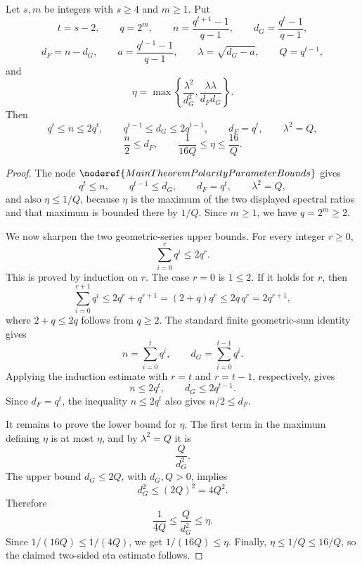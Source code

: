 \begin{helper}
Let \(s,m\) be integers with \(s\ge4\) and \(m\ge1\).  Put
\[
  t=s-2,\qquad q=2^m,\qquad
  n=\frac{q^{t+1}-1}{q-1},\qquad
  d_G=\frac{q^t-1}{q-1},
\]
\[
  d_F=n-d_G,\qquad
  a=\frac{q^{t-1}-1}{q-1},\qquad
  \lambda=\sqrt{d_G-a},\qquad Q=q^{t-1},
\]
and
\[
  \eta=\max\left\{\frac{\lambda^2}{d_G^2},
    \frac{\lambda\lambda}{d_Fd_G}\right\}.
\]
Then
\[
  q^t\le n\le2q^t,\qquad
  q^{t-1}\le d_G\le2q^{t-1},\qquad
  d_F=q^t,\qquad \lambda^2=Q,
\]
\[
  \frac n2\le d_F,\qquad
  \frac{1}{16Q}\le\eta\le\frac{16}{Q}.
\]
\end{helper}
\begin{proof}
The node \(\noderef{MainTheoremPolarityParameterBounds}\) gives
\[
  q^t\le n,\qquad q^{t-1}\le d_G,\qquad d_F=q^t,\qquad
  \lambda^2=Q,
\]
and also \(\eta\le 1/Q\), because \(\eta\) is the maximum of the two displayed
spectral ratios and that maximum is bounded there by \(1/Q\).  Since \(m\ge1\),
we have \(q=2^m\ge2\).

We now sharpen the two geometric-series upper bounds.  For every integer
\(r\ge0\),
\[
  \sum_{i=0}^r q^i\le 2q^r.
\]
This is proved by induction on \(r\).  The case \(r=0\) is \(1\le2\).  If it
holds for \(r\), then
\[
  \sum_{i=0}^{r+1}q^i
    \le 2q^r+q^{r+1}
    =(2+q)q^r
    \le 2q\,q^r
    =2q^{r+1},
\]
where \(2+q\le2q\) follows from \(q\ge2\).  The standard finite geometric-sum
identity gives
\[
  n=\sum_{i=0}^t q^i,\qquad d_G=\sum_{i=0}^{t-1}q^i.
\]
Applying the induction estimate with \(r=t\) and \(r=t-1\), respectively,
gives
\[
  n\le2q^t,\qquad d_G\le2q^{t-1}.
\]
Since \(d_F=q^t\), the inequality \(n\le2q^t\) also gives \(n/2\le d_F\).

It remains to prove the lower bound for \(\eta\).  The first term in the
maximum defining \(\eta\) is at most \(\eta\), and by \(\lambda^2=Q\) it is
\[
  \frac{Q}{d_G^2}.
\]
The upper bound \(d_G\le2Q\), with \(d_G,Q>0\), implies
\[
  d_G^2\le (2Q)^2=4Q^2.
\]
Therefore
\[
  \frac{1}{4Q}\le \frac{Q}{d_G^2}\le \eta.
\]
Since \(1/(16Q)\le1/(4Q)\), we get \(1/(16Q)\le\eta\).  Finally,
\(\eta\le1/Q\le16/Q\), so the claimed two-sided eta estimate follows.
\end{proof}
